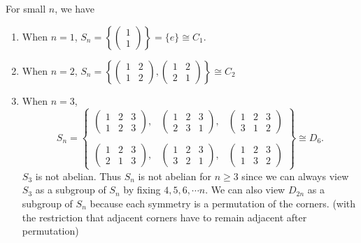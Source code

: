 \documentclass[a4pape]{article}
\begin{document}
\begin{eg}
  For small $n$, we have
  \begin{enumerate}
  \item When $n = 1$, $S_n = \left\{\begin{pmatrix}1\\1\end{pmatrix}\right\} = \{e\}\cong C_1$.
  \item When $n = 2$, $S_n = \left\{\begin{pmatrix}1 & 2\\ 1 & 2\end{pmatrix}, \begin{pmatrix}1 & 2\\2 & 1\end{pmatrix}\right\}\cong C_2$
  \item When $n = 3$,
    \[
    S_n = \left\{\begin{matrix}\begin{pmatrix}1 & 2 & 3\\1 & 2 & 3\end{pmatrix}, &\begin{pmatrix}1 & 2 & 3\\ 2 & 3 & 1\end{pmatrix}, &\begin{pmatrix}1 & 2 & 3\\3 & 1 & 2\end{pmatrix}\\\\\begin{pmatrix}1 & 2 & 3\\2 & 1 & 3\end{pmatrix}, &\begin{pmatrix}1 & 2 & 3\\ 3 & 2 & 1\end{pmatrix}, &\begin{pmatrix}1 & 2 & 3\\1 & 3 & 2\end{pmatrix}\end{matrix}\right\}\cong D_6.
    \]
  \note $S_3$ is not abelian. Thus $S_n$ is not abelian for $n \geq 3$ since we can always view $S_3$ as a subgroup of $S_n$ by fixing $4, 5, 6, \cdots n$.
  \note We can also view $D_{2n}$ as a subgroup of $S_n$ because each symmetry is a permutation of the corners. (with the restriction that adjacent corners have to remain adjacent after permutation)
  \end{enumerate}
\end{eg}
\end{document}
